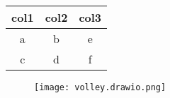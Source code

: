 \documentclass{article}
\begin{document}
\begin{tabular}{|c|c|c|}
	\hline
	\textbf{col1} & \textbf{col2} & \textbf{col3} \\ \hline
	a & b & e \\ \hline
	c & d & f \\ \hline
\end{tabular}
\begin{figure}[h!]
\texttt{[image: volley.drawio.png]}
\end{figure}
\end{document}
